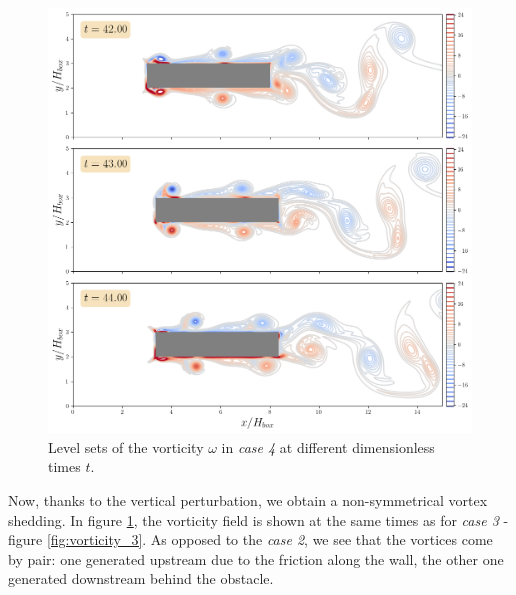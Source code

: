 \documentclass[11 pt]{article}
\begin{document}
\begin{figure}[H]
    \centering
    \includegraphics[width=\textwidth]{../figures/vorticity_case_4_part1.png}
    \caption{Level sets of the vorticity $\omega$ in \textit{case 4} at different dimensionless times $t$.}
    \label{fig:vorticity_4a}
\end{figure}

Now, thanks to the vertical perturbation, we obtain a non-symmetrical vortex shedding. In figure \ref{fig:vorticity_4a}, the vorticity field is shown at the same times as for \textit{case 3} - figure \ref{fig:vorticity_3}. As opposed to the \textit{case 2}, we see that the vortices come by pair: one generated upstream due to the friction along the wall, the other one generated downstream behind the obstacle. 
\end{document}
